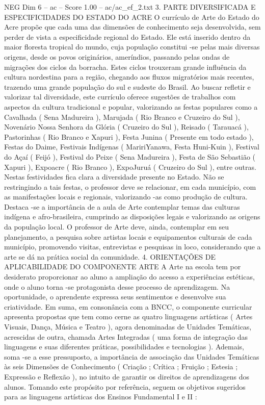 \begin{textsample}{NEG Dim 6 – ac – Score 1.00 – ac/ac\_ef\_2.txt}  \label{ex:f6_neg_132}
3.
PARTE DIVERSIFICADA E ESPECIFICIDADES DO ESTADO DO ACRE O currículo de Arte do Estado do Acre propõe que cada uma das dimensões de conhecimento seja desenvolvida, sem perder de vista a especificidade regional do Estado.
Ele está inserido dentro da maior floresta tropical do mundo, cuja população constitui -se pelas mais diversas origens, desde os povos originários, ameríndios, passando pelas ondas de migrações dos ciclos da borracha.
Estes ciclos trouxeram grande influência da cultura nordestina para a região, chegando aos fluxos migratórios mais recentes, trazendo uma grande população do sul e sudeste do Brasil.
Ao buscar refletir e valorizar tal diversidade, este currículo oferece sugestões de trabalhos com aspectos da cultura tradicional e popular, valorizando as festas populares como a Cavalhada ( Sena Madureira ), Marujada ( Rio Branco e Cruzeiro do Sul ), Novenário Nossa Senhora da Glória ( Cruzeiro do Sul ), Reisado ( Tarauacá ), Pastorinhas ( Rio Branco e Xapuri ), Festa Junina ( Presente em todo estado ), Festas do Daime, Festivais Indígenas ( MaririYanawa, Festa Huni-Kuin ), Festival do Açaí ( Feijó ), Festival do Peixe ( Sena Madureira ), Festa de São Sebastião ( Xapuri ), Expoacre ( Rio Branco ), ExpoJuruá ( Cruzeiro do Sul ), entre outras.
Nestas festividades fica clara a diversidade presente no Estado.
Não se restringindo a tais festas, o professor deve se relacionar, em cada município, com as manifestações locais e regionais, valorizando -as como produção de cultura.
Destaca -se a importância de a aula de Arte contemplar temas das culturas indígena e afro-brasileira, cumprindo as disposições legais e valorizando as origens da população local.
O professor de Arte deve, ainda, contemplar em seu planejamento, a pesquisa sobre artistas locais e equipamentos culturais de cada município, promovendo visitas, entrevistas e pesquisas in loco, considerando que a arte se dá na prática social da comunidade. 4.
ORIENTAÇÕES DE APLICABILIDADE DO COMPONENTE ARTE A Arte na escola tem por desiderato proporcionar ao aluno a ampliação do acesso a experiências estéticas, onde o aluno torna -se protagonista desse processo de aprendizagem.
Na oportunidade, o aprendente expressa seus sentimentos e desenvolve sua criatividade.
Em suma, em consonância com a BNCC, o componente curricular apresenta propostas que tem como cerne as quatro linguagens artísticas ( Artes Visuais, Dança, Música e Teatro ), agora denominadas de Unidades Temáticas, acrescidas de outra, chamada Artes Integradas ( uma forma de integração das linguagens e suas diferentes práticas, possibilidades e tecnologias ).
Ademais, soma -se a esse pressuposto, a importância de associação das Unidades Temáticas às seis Dimensões de Conhecimento ( Criação ; Crítica ; Fruição ; Estesia ; Expressão e Reflexão ), no intuito de garantir os direitos de aprendizagens dos alunos.
Tomando este propósito por referência, seguem os objetivos sugeridos para as linguagens artísticas dos Ensinos Fundamental I e II :

\end{textsample}
